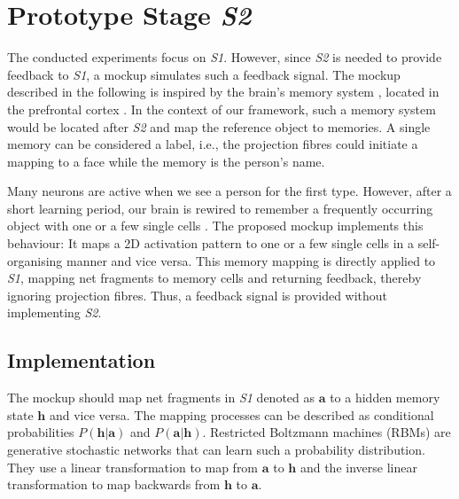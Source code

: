 \section{Prototype Stage \emph{S2}}
The conducted experiments focus on \emph{S1}.
However, since \emph{S2} is needed to provide feedback to \emph{S1}, a mockup simulates such a feedback signal.
The mockup described in the following is inspired by the brain's memory system , located in the prefrontal cortex .
In the context of our framework, such a memory system would be located after \emph{S2} and map the reference object to memories.
A single memory can be considered a label, i.e., the projection fibres could initiate a mapping to a face while the memory is the person's name.

Many neurons are active when we see a person for the first type.
However, after a short learning period, our brain is rewired to remember a frequently occurring object with one or a few single cells .
The proposed mockup implements this behaviour: It maps a 2D activation pattern to one or a few single cells in a self-organising manner and vice versa.
This memory mapping is directly applied to \emph{S1}, mapping net fragments to memory cells and returning feedback, thereby ignoring projection fibres.
Thus, a feedback signal is provided without implementing \emph{S2}.



\subsection{Implementation}
The mockup should map net fragments in \emph{S1} denoted as $\boldsymbol{a}$ to a hidden memory state $\boldsymbol{h}$ and vice versa. The mapping processes can be described as conditional probabilities $P(\boldsymbol{h}|\boldsymbol{a})$ and $P(\boldsymbol{a}|\boldsymbol{h})$.
Restricted Boltzmann machines (RBMs)  are generative stochastic networks that can learn such a probability distribution.
They use a linear transformation to map from $\boldsymbol{a}$ to $\boldsymbol{h}$ and the inverse linear transformation to map backwards from $\boldsymbol{h}$ to $\boldsymbol{a}$.

